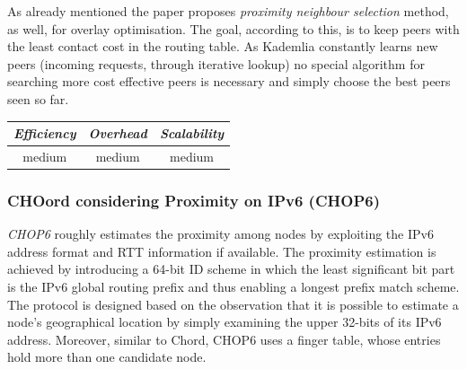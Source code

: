 As already mentioned the paper proposes \emph{proximity neighbour selection}
method, as well, for overlay optimisation. The goal, according to this, is to
keep peers with the least contact cost in the routing table. As Kademlia
constantly learns new peers (incoming requests, through iterative lookup) no
special algorithm for searching more cost effective peers is necessary and
simply choose the best peers seen so far.

\begin{center}
\begin{tabular}{ccc}
\emph{Efficiency} & \emph{Overhead} & \emph{Scalability} \\
\hline
medium &
% 
medium &
%
medium
\end{tabular}
\end{center}

\subsubsection{CHOord considering Proximity on IPv6 (CHOP6)}
\emph{CHOP6} \cite{MT2007} roughly estimates the proximity among
nodes by exploiting the IPv6 address format and RTT information if available.
The proximity estimation is achieved by introducing a 64-bit ID scheme in which
the least significant bit part is the IPv6 global routing prefix and thus
enabling a longest prefix match scheme. The protocol is designed based on the
observation that it is possible to estimate a node's geographical location by
simply examining the upper 32-bits of its IPv6 address. Moreover, similar to
Chord, CHOP6 uses a finger table, whose entries hold more than
one candidate node.

%
%

